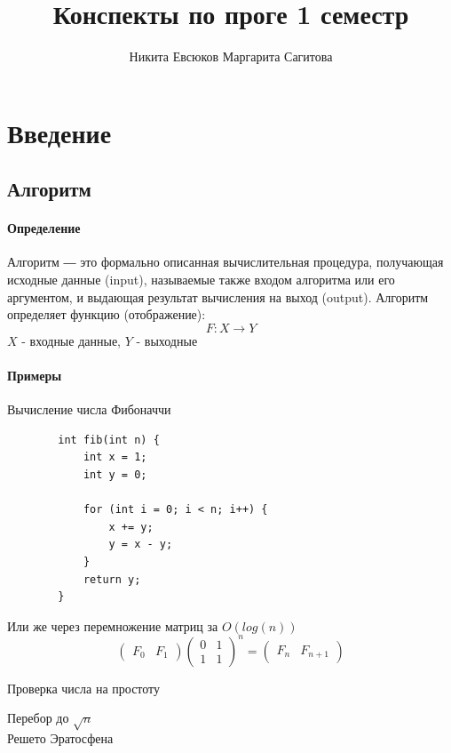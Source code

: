 \documentclass[a4paper,10pt]{article}
\title{Конспекты по проге 1 семестр}
\author{{Никита Евсюков} {Маргарита Сагитова}}
\date{}
\begin{document}
	\maketitle
	\tableofcontents
	\newpage
	
	\section{Введение}
	\subsection{Алгоритм}
	\paragraph{Определение}
		Алгоритм ― это формально описанная вычислительная процедура, получающая исходные данные (input), называемые также входом алгоритма или его аргументом, и выдающая результат вычисления на выход (output).
		Алгоритм определяет функцию (отображение):
		\begin{equation}
			F \colon X \to Y
		\end{equation}
		$X$ - входные данные, $Y$ - выходные
	\paragraph{Примеры}
	\begin{center}
	Вычисление числа Фибоначчи
	\end{center}
	\begin{lstlisting}
		int fib(int n) {
			int x = 1;
			int y = 0;
			
			for (int i = 0; i < n; i++) {
				x += y;
				y = x - y;
			}
			return y;
		}
	\end{lstlisting}
	Или же через перемножение матриц за $O(log(n))$
	\[
	\begin{pmatrix}
		F_{0} & F_{1}
	\end{pmatrix}
	\begin{pmatrix}
		0 & 1 \\
		1 & 1
	\end{pmatrix} ^ {\!\!n}
	=
	\begin{pmatrix}
		F_{n} & F_{n+1}
	\end{pmatrix}
	\]

	\begin{center}
		Проверка числа на простоту
	\end{center}
	Перебор до $\sqrt{n}$ \\
	Решето Эратосфена
	
\end{document}
